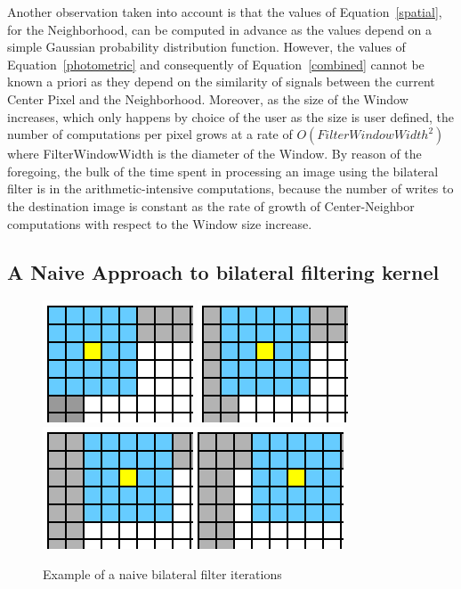 \documentclass{IEEEtran}
\begin{document}
Another observation taken into account is that the values of Equation~\ref{spatial}, for the Neighborhood, can be computed in advance as the values depend on a simple Gaussian probability distribution function. However, the values of Equation~\ref{photometric} and consequently of Equation~\ref{combined} cannot be known a priori as they depend on the similarity of signals between the current Center Pixel and the Neighborhood. Moreover, as the size of the Window increases, which only happens by choice of the user as the size is user defined, the number of computations per pixel grows at a rate of $O(FilterWindowWidth^{2})$ where FilterWindowWidth is the diameter of the Window. By reason of the foregoing, the bulk of the time spent in processing an image using the bilateral filter is in the arithmetic-intensive computations, because the number of writes to the destination image is constant as the rate of growth of Center-Neighbor computations with respect to the Window size increase.

\subsection{A Naive Approach to bilateral filtering kernel}

\begin{figure}
\centering\includegraphics[scale=0.35]{images/the1}
\includegraphics[clip,scale=0.35]{images/the202}\includegraphics[scale=0.35]{images/the2}\includegraphics[scale=0.35]{images/the3}
\caption{Example of a naive bilateral filter iterations}
\end{figure}
\end{document}
